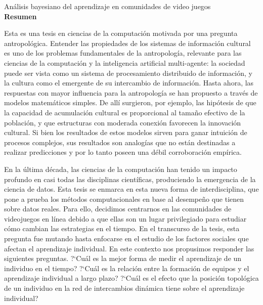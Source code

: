 \documentclass[a4paper,11pt]{book}
\theoremstyle{definition}
\newcommand{\TITULO}[0]{An\'alisis bayesiano del aprendizaje en comunidades de video juegos}
\begin{document}
\thispagestyle{empty}
\phantom{Pagina en blanco}
\newpage


\phantom{.}

\vspace{6cm}

\hfill  {}

\newpage

\phantom{Pagina en blanco}

\newpage

\begin{center}
\Large \TITULO \normalsize \\[0.5cm]

\textbf{Resumen}
\end{center}

\small

Esta es una tesis en ciencias de la computaci\'on motivada por una pregunta antropol\'ogica.
Entender las propiedades de los sistemas de informaci\'on cultural es uno de los problemas fundamentales de la antropolog\'ia, relevante para las ciencias de la computaci\'on y la inteligencia artificial multi-agente: la sociedad puede ser vista como un sistema de procesamiento distribuido de informaci\'on, y la cultura como el emergente de su intercambio de informaci\'on.
Hasta ahora, las respuestas con mayor influencia para la antropolog\'ia se han propuesto a trav\'es de modelos matem\'aticos simples.
De all\'i surgieron, por ejemplo, las hip\'otesis de que la capacidad de acumulaci\'on cultural es proporcional al tama\~no efectivo de la poblaci\'on, y que estructuras con moderada conexi\'on favorecen la innovaci\'on cultural.
Si bien los resultados de estos modelos sirven para ganar intuici\'on de procesos complejos, sus resultados son analog\'ias que no est\'an destinadas a realizar predicciones y por lo tanto poseen una d\'ebil corroboraci\'on emp\'irica.


En la \'ultima d\'ecada, las ciencias de la computaci\'on han tenido un impacto profundo en casi todas las disciplinas cient\'ificas, produciendo la emergencia de la ciencia de datos.
Esta tesis se enmarca en esta nueva forma de interdisciplina, que pone a prueba los m\'etodos computacionales en base al desempe\~no que tienen sobre datos reales.
Para ello, decidimos centrarnos en las comunidades de videojuegos en l\'inea debido a que ellas son un lugar privilegiado para estudiar c\'omo cambian las estrategias en el tiempo.
En el transcurso de la tesis, esta pregunta fue mutando hasta enfocarse en el estudio de los factores sociales que afectan el aprendizaje individual.
En este contexto nos propusimos responder las siguientes preguntas.
?`Cu\'al es la mejor forma de medir el aprendizaje de un individuo en el tiempo?
?`Cu\'al es la relaci\'on entre la formaci\'on de equipos y el aprendizaje individual a largo plazo?
?`Cu\'al es el efecto que la posici\'on topol\'ogica de un individuo en la red de intercambios din\'amica tiene sobre el aprendizaje individual?
\end{document}
